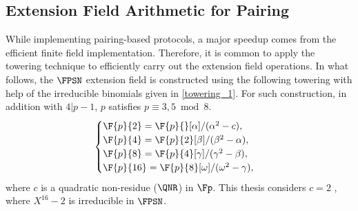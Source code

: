 \subsection{Extension Field Arithmetic for Pairing}
While implementing pairing-based protocols, a major speedup comes from the efficient finite field implementation.
Therefore, it is common to apply the towering technique to efficiently carry out the extension field operations.
In what follows, the $\FPSN$ extension field is constructed using the following towering with help of the irreducible binomials given in \eqref{towering_1}.
For such construction, in addition with $4|p-1$, $p$ satisfies $p \equiv 3, 5 \bmod 8$.  
\begin{equation}\label{towering_1}
\begin{cases}
\F{p}{2} = \F{p}{}[\alpha]/(\alpha^2-c),  \\ 
\F{p}{4} = \F{p}{2}[\beta]/(\beta^2-\alpha),  \\ 
\F{p}{8} = \F{p}{4}[\gamma]/(\gamma^2-\beta), \\ 
\F{p}{16} = \F{p}{8}[\omega]/(\omega^2-\gamma), \\ 
\end{cases}
\end{equation}
where  $c$ is a quadratic non-residue  ($\QNR$) in $\Fp$. 
This thesis considers  $c = 2$ , where $X^{16}-2$ is irreducible in $\FPSN$.

